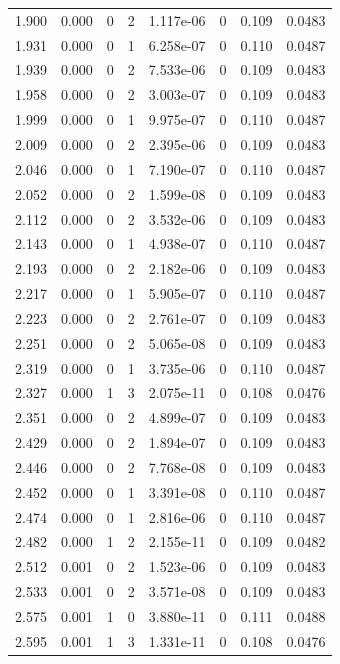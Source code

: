 \documentclass[preview]{standalone}
\begin{document}
{{{\begin{tabular}{L{1.2cm}C{1.2cm} C{0.3cm}C{0.5cm} C{1.4cm}C{1.4cm} C{1.4cm}C{1.4cm}}
  1.900  &  0.000  & 0     &  2 &  1.117e-06  & 0  & 0.109 &  0.0483   \\ 
  1.931  &  0.000  & 0     &  1 &  6.258e-07  & 0  & 0.110 &  0.0487   \\ 
  1.939  &  0.000  & 0     &  2 &  7.533e-06  & 0  & 0.109 &  0.0483   \\ 
  1.958  &  0.000  & 0     &  2 &  3.003e-07  & 0  & 0.109 &  0.0483   \\ 
  1.999  &  0.000  & 0     &  1 &  9.975e-07  & 0  & 0.110 &  0.0487   \\ 
  2.009  &  0.000  & 0     &  2 &  2.395e-06  & 0  & 0.109 &  0.0483   \\ 
  2.046  &  0.000  & 0     &  1 &  7.190e-07  & 0  & 0.110 &  0.0487   \\ 
  2.052  &  0.000  & 0     &  2 &  1.599e-08  & 0  & 0.109 &  0.0483   \\ 
  2.112  &  0.000  & 0     &  2 &  3.532e-06  & 0  & 0.109 &  0.0483   \\ 
  2.143  &  0.000  & 0     &  1 &  4.938e-07  & 0  & 0.110 &  0.0487   \\ 
  2.193  &  0.000  & 0     &  2 &  2.182e-06  & 0  & 0.109 &  0.0483   \\ 
  2.217  &  0.000  & 0     &  1 &  5.905e-07  & 0  & 0.110 &  0.0487   \\ 
  2.223  &  0.000  & 0     &  2 &  2.761e-07  & 0  & 0.109 &  0.0483   \\ 
  2.251  &  0.000  & 0     &  2 &  5.065e-08  & 0  & 0.109 &  0.0483   \\ 
  2.319  &  0.000  & 0     &  1 &  3.735e-06  & 0  & 0.110 &  0.0487   \\ 
  2.327  &  0.000  & 1     &  3 &  2.075e-11  & 0  & 0.108 &  0.0476   \\ 
  2.351  &  0.000  & 0     &  2 &  4.899e-07  & 0  & 0.109 &  0.0483   \\ 
  2.429  &  0.000  & 0     &  2 &  1.894e-07  & 0  & 0.109 &  0.0483   \\ 
  2.446  &  0.000  & 0     &  2 &  7.768e-08  & 0  & 0.109 &  0.0483   \\ 
  2.452  &  0.000  & 0     &  1 &  3.391e-08  & 0  & 0.110 &  0.0487   \\ 
  2.474  &  0.000  & 0     &  1 &  2.816e-06  & 0  & 0.110 &  0.0487   \\ 
  2.482  &  0.000  & 1     &  2 &  2.155e-11  & 0  & 0.109 &  0.0482   \\ 
  2.512  &  0.001  & 0     &  2 &  1.523e-06  & 0  & 0.109 &  0.0483   \\ 
  2.533  &  0.001  & 0     &  2 &  3.571e-08  & 0  & 0.109 &  0.0483   \\ 
  2.575  &  0.001  & 1     &  0 &  3.880e-11  & 0  & 0.111 &  0.0488   \\ 
  2.595  &  0.001  & 1     &  3 &  1.331e-11  & 0  & 0.108 &  0.0476   \\ 
\hline 
\end{tabular} 

}}}
\end{document}
